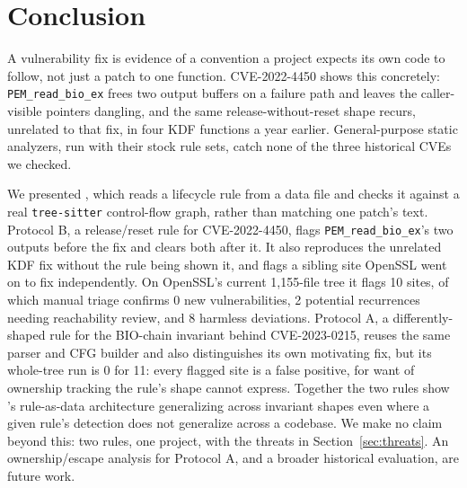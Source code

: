 \section{Conclusion}
\label{sec:conclusion}

A vulnerability fix is evidence of a convention a project expects its own
code to follow, not just a patch to one function. CVE-2022-4450 shows
this concretely: \texttt{PEM\_read\_bio\_ex} frees two output buffers on
a failure path and leaves the caller-visible pointers dangling, and the
same release-without-reset shape recurs, unrelated to that fix, in four
KDF functions a year earlier. General-purpose static analyzers, run with
their stock rule sets, catch none of the three historical CVEs we
checked.

We presented \tool, which reads a lifecycle rule from a data file and
checks it against a real \texttt{tree-sitter} control-flow graph, rather
than matching one patch's text. Protocol B, a release/reset rule for
CVE-2022-4450, flags \texttt{PEM\_read\_bio\_ex}'s two outputs before the
fix and clears both after it. It also reproduces the unrelated KDF fix
without the rule being shown it, and flags a sibling site OpenSSL went on
to fix independently. On OpenSSL's current 1{,}155-file tree it flags 10 sites,
of which manual triage confirms 0 new vulnerabilities, 2 potential
recurrences needing reachability review, and 8 harmless deviations.
Protocol A, a differently-shaped rule for the BIO-chain
invariant behind CVE-2023-0215, reuses the same parser and CFG builder
and also distinguishes its own motivating fix, but its whole-tree run is
0 for 11: every flagged site is a false positive, for want of ownership
tracking the rule's shape cannot express. Together the two rules show
\tool's rule-as-data architecture generalizing across invariant shapes
even where a given rule's detection does not generalize across a
codebase. We make no claim beyond this: two rules, one project, with the
threats in Section~\ref{sec:threats}. An ownership/escape analysis for
Protocol A, and a broader historical evaluation, are future work.
